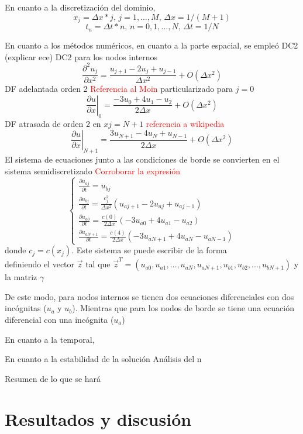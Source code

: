 \documentclass[aps,prb,twocolumn,superscriptaddress,floatfix,longbibliography,10pt]{revtex4-2}
\newcounter{para}
\begin{document}
En cuanto a la discretización del dominio,
\[x_j = \Delta x * j, \, j = 1,\dots,M, \, \Delta x = 1/(M+1) \]
\[t_n = \Delta t * n, \, n = 0,1,\dots,N, \, \Delta t = 1/N \]

En cuanto a los métodos numéricos, en cuanto a la parte espacial, se empleó DC2 (explicar ece)
DC2 para los nodos internos
\[\frac{\partial^2 u_j}{\partial x^2} = \frac{u_{j+1} - 2 u_j + u_{j-1}}{\Delta x^2} + O(\Delta x^2)  \]
DF adelantada orden 2 \textcolor{red}{Referencia al Moin}
particularizado para $j = 0$
\[\left . \frac{\partial u}{\partial x} \right |_0 = \frac{-3 u_0 + 4 u_{1} - u_{2}}{2 \Delta x} + O(\Delta x^2) \]
DF atrasada de orden 2 en $xj = N + 1$ \textcolor{red}{referencia a wikipedia}
\[\left . \frac{\partial u}{\partial x} \right |_{N+1} = \frac{3 u_{N+1} - 4 u_N + u_{N-1}}{2 \Delta x} + O(\Delta x^2) \]
El sistema de ecuaciones junto a las condiciones de borde se convierten en el sistema semidiscretizado \textcolor{red}{Corroborar la expresión}
\[
  \left \{ \begin{matrix}
   \frac{\partial u_{a j}}{\partial t} = u_{b j} \\
   \frac{\partial u_{b j}}{\partial t} = \frac{c_j^2}{\Delta x^2} (u_{a j+1} - 2 u_{a j} + u_{a j-1}) \\
   \frac{\partial u_{a 0}}{\partial t} = \frac{c(0)}{2 \Delta x} (-3 u_{a 0} + 4 u_{a 1} - u_{a 2}) \\
   \frac{\partial u_{a N+1}}{\partial t} = \frac{c(4)}{2 \Delta x} (-3u_{a N+1} + 4 u_{a N} - u_{a N-1}) 
  \end{matrix} \right .  
\]
donde $c_j = c(x_j)$. Este sistema se puede escribir de la forma 
\[ \]
definiendo el vector $\vec{z}$ tal que $\vec{z}^T = (u_{a 0}, u_{a 1}, \dots, u_{a N}, u_{a N+1}, u_{b 1}, u_{b 2}, \dots, u_{b N+1})$ y la matriz $\gamma$

De este modo, para nodos internos se tienen dos ecuaciones diferenciales con dos incógnitas ($u_a$ y $u_b$). Mientras que para los nodos de borde se tiene una ecuación diferencial con una incógnita ($u_a$)


En cuanto a la temporal,


En cuanto a la estabilidad de la solución
Análisis del n



Resumen de lo que se hará


\section{Resultados y discusión}
\end{document}
